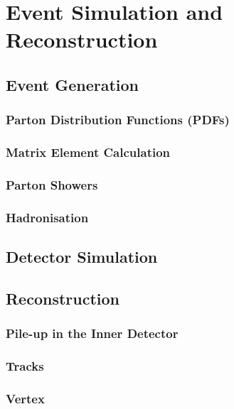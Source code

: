 \chapter{Event Simulation and Reconstruction}

	\section{Event Generation}

		\subsection{Parton Distribution Functions (PDFs)}


		\subsection{Matrix Element Calculation}


		\subsection{Parton Showers}


		\subsection{Hadronisation}




	\section{Detector Simulation}




	\section{Reconstruction}

		\subsection{Pile-up in the Inner Detector}


		\subsection{Tracks}


		\subsection{Vertex}


